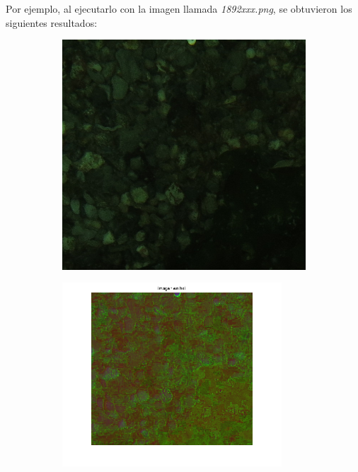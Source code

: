 \documentclass{article}
\begin{document}
Por ejemplo, al ejecutarlo con la imagen llamada \textit{1892xxx.png}, se obtuvieron los siguientes resultados:

\begin{figure}[H]
	\begin{subfigure}{0.5\textwidth}
	\centering
        \includegraphics[scale=0.5]{1892xxx.png}
    \end{subfigure}\hfill
	\begin{subfigure}{0.5\textwidth}
	\centering
        \includegraphics[width=0.9\textwidth]{1892xxx-hsi.png}

\end{subfigure}
\end{figure}
\end{document}
